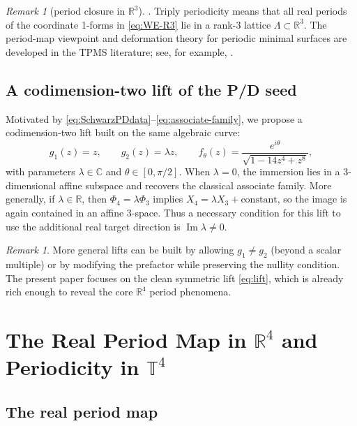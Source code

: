 \documentclass[12pt]{article}
\numberwithin{equation}{section}
\theoremstyle{definition}
\theoremstyle{remark}
\newtheorem{remark}[theorem]{Remark}
\begin{document}
\medskip

\noindent
\begin{remark} [period closure in $\mathbb{R}^3$].
Triply periodicity means that all real periods of the coordinate 1-forms in \eqref{eq:WE-R3} lie in a rank-3 lattice $\Lambda\subset\mathbb{R}^3$.
The period-map viewpoint and deformation theory for periodic minimal surfaces are developed in the TPMS literature; see, for example, \cite{PirolaSpin,GBrauckmannSurvey}.
\end{remark}

\subsection{A codimension-two lift of the P/D seed}

Motivated by \eqref{eq:SchwarzPDdata}--\eqref{eq:associate-family}, we propose a codimension-two lift built on the same algebraic curve:
\begin{equation}\label{eq:lift}
g_1(z)=z,
\qquad
g_2(z)=\lambda z,
\qquad
f_\theta(z)=\frac{e^{i\theta}}{\sqrt{1-14z^4+z^8}},
\end{equation}
with parameters $\lambda\in\mathbb{C}$ and $\theta\in[0,\pi/2]$.
When $\lambda=0$, the immersion lies in a 3-dimensional affine subspace and recovers the classical associate family.  More generally, if $\lambda\in\mathbb{R}$, then $\Phi_4=\lambda\Phi_3$ implies $X_4=\lambda X_3+\mathrm{constant}$, so the image is again contained in an affine $3$-space.  Thus a necessary condition for this lift to use the additional real target direction is $\operatorname{Im}\lambda\neq0$.

\begin{remark}
More general lifts can be built by allowing $g_1\neq g_2$ (beyond a scalar multiple) or by modifying the prefactor while preserving the nullity condition.
The present paper focuses on the clean symmetric lift \eqref{eq:lift}, which is already rich enough to reveal the core $\mathbb{R}^4$ period phenomena.
\end{remark}

\section{The Real Period Map in $\mathbb{R}^4$ and Periodicity in $\mathbb{T}^4$}\label{sec:period}

\subsection{The real period map}
\end{document}
